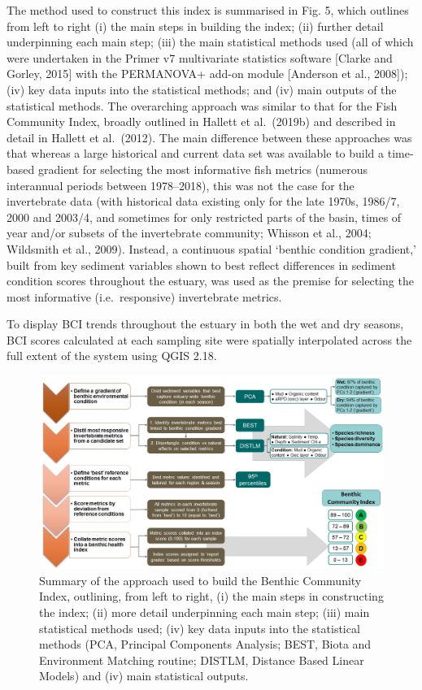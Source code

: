\documentclass[
]{book}
\begin{document}
The method used to construct this index is summarised in Fig. 5, which outlines from left to right (i) the main steps in building the index; (ii) further detail underpinning each main step; (iii) the main statistical methods used (all of which were undertaken in the Primer v7 multivariate statistics software {[}Clarke and Gorley, 2015{]} with the PERMANOVA+ add-on module {[}Anderson et al., 2008{]}); (iv) key data inputs into the statistical methods; and (iv) main outputs of the statistical methods. The overarching approach was similar to that for the Fish Community Index, broadly outlined in Hallett et al.~(2019b) and described in detail in Hallett et al.~(2012). The main difference between these approaches was that whereas a large historical and current data set was available to build a time-based gradient for selecting the most informative fish metrics (numerous interannual periods between 1978--2018), this was not the case for the invertebrate data (with historical data existing only for the late 1970s, 1986/7, 2000 and 2003/4, and sometimes for only restricted parts of the basin, times of year and/or subsets of the invertebrate community; Whisson et al., 2004; Wildsmith et al., 2009). Instead, a continuous spatial `benthic condition gradient,' built from key sediment variables shown to best reflect differences in sediment condition scores throughout the estuary, was used as the premise for selecting the most informative (i.e.~responsive) invertebrate metrics.

To display BCI trends throughout the estuary in both the wet and dry seasons, BCI scores calculated at each sampling site were spatially interpolated across the full extent of the system using QGIS 2.18.~

\begin{figure}
\includegraphics[width=1\linewidth]{images/BMI/picture7} \caption{Summary of the approach used to build the Benthic Community Index, outlining, from left to right, (i) the main steps in constructing the index; (ii) more detail underpinning each main step; (iii) main statistical methods used; (iv) key data inputs into the statistical methods (PCA, Principal Components Analysis; BEST, Biota and Environment Matching routine; DISTLM, Distance Based Linear Models) and (iv) main statistical outputs.}\label{fig:BMI-pic7}
\end{figure}
\end{document}
